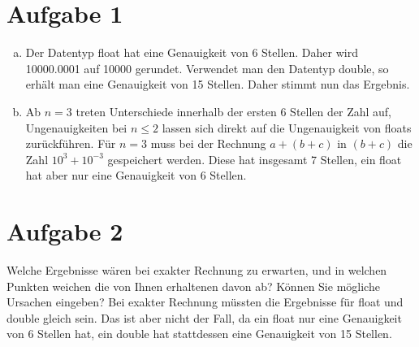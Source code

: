 \documentclass{article}
\begin{document}
	\section*{Aufgabe 1}
	\begin{enumerate}[a)]
		\item Der Datentyp float hat eine Genauigkeit von 6 Stellen. Daher wird 10000.0001 auf 10000 gerundet.
		Verwendet man den Datentyp double, so erhält man eine Genauigkeit von 15 Stellen. Daher stimmt nun das Ergebnis.
		
		\item Ab $n=3$ treten Unterschiede innerhalb der ersten 6 Stellen der Zahl auf, Ungenauigkeiten bei $n\leq 2$ lassen sich direkt auf die Ungenauigkeit von floats zurückführen. Für $n=3$ muss bei der Rechnung $a + (b+c)$ in $(b+c)$ die Zahl $10^3 + 10^{-3}$ gespeichert werden. Diese hat insgesamt 7 Stellen, ein float hat aber nur eine Genauigkeit von 6 Stellen.
		
	\end{enumerate}
	\section*{Aufgabe 2}
	Welche Ergebnisse wären bei exakter Rechnung zu erwarten, und in welchen Punkten weichen
	die von Ihnen erhaltenen davon ab? Können Sie mögliche Ursachen eingeben?
	Bei exakter Rechnung müssten die Ergebnisse für float und double gleich sein. Das ist aber nicht der Fall, da ein float nur eine Genauigkeit von 6 Stellen hat, ein double hat stattdessen eine Genauigkeit von 15 Stellen.
	
\end{document}
